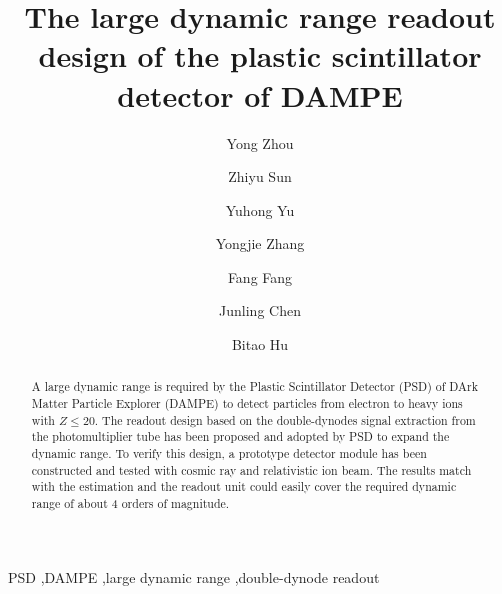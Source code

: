 \documentclass[preprint, times]{elsarticle}
\begin{document}
\begin{frontmatter}

\title{The large dynamic range readout design of the plastic scintillator detector of DAMPE}

\author[imp,lzu,ucas]{Yong Zhou}
\author[imp]{Zhiyu Sun}

\author[imp]{Yuhong Yu}

\author[imp]{Yongjie Zhang}
\author[imp]{Fang Fang}
\author[imp]{Junling Chen}

\author[lzu]{Bitao Hu}

\address[imp]{Institute of Modern Physics, Chinese Academy of Sciences,  509 Nanchang Road,  Lanzhou,  730000,  P.R.China}
\address[lzu]{School of Nuclear Science and Technology,  Lanzhou University,  222 South Tianshui Road,  Lanzhou,  730000,  P.R.China}
\address[ucas]{Graduate University of the Chinese Academy of Sciences,  19A Yuquan Road,  Beijing,  100049,  P.R.China}
\begin{abstract}

A large dynamic range is required by the Plastic Scintillator Detector (PSD) of DArk Matter Particle Explorer (DAMPE) to detect particles from electron to heavy ions with $Z\leq 20$.
The readout design based on the double-dynodes signal extraction from the photomultiplier tube has been proposed and adopted by PSD to expand the dynamic range. 
To verify this design, a prototype detector module has been constructed and tested with cosmic ray and relativistic ion beam.
The results match with the estimation and the readout unit could easily cover the required dynamic range of about 4 orders of magnitude.

\end{abstract}

\begin{keyword}
PSD
\sep DAMPE
\sep large dynamic range
\sep double-dynode readout


\end{keyword}

\end{frontmatter}

\linenumbers
\end{document}
